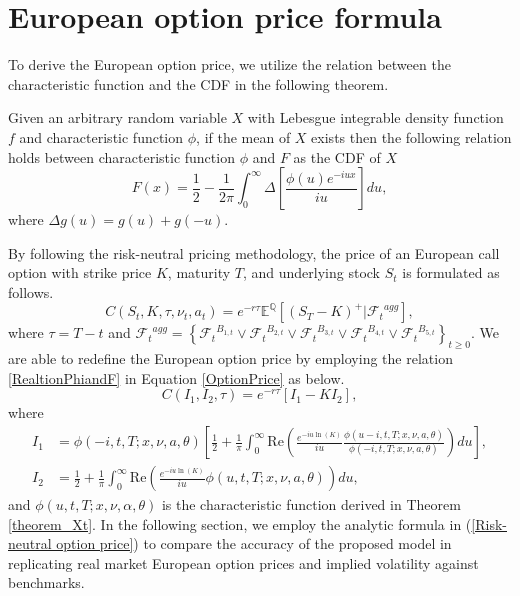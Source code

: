\documentclass[twoside]{article}
\begin{document}
\section{European option price formula}
To derive the European option price, we utilize the relation between the characteristic function and the CDF in the following theorem.
%
\begin{thm}\label{theorem_relation}
Given an arbitrary random variable $ X $ with Lebesgue integrable density function $ f $ and characteristic function $ \phi $, if the mean of $ X $ exists
then the following relation holds between characteristic function $ \phi $ and $ F $ as the CDF of $ X $
\begin{equation}\label{RealtionPhiandF}
F\left( x\right) =\frac{1}{2} - \frac{1}{2\pi}\int^{\infty}_{0} \Delta \left[ \frac{\phi\left( u \right) e^{-iux}}{iu} \right] du,
\end{equation}
where $ \Delta g(u)=g(u)+g(-u) $.
\end{thm}
\noindent
By following the risk-neutral pricing methodology, the price of an European call option with strike price $K$, maturity $T$, and underlying stock $S_t$ is 
formulated as follows.
\begin{equation}\label{OptionPrice}
C(S_t, K, \tau, \nu_t, a_t)=e^{-r\tau} \mathbb{E}^{\mathbb{Q}}\left[ (S_T - K )^{+} \vert {\mathcal{F}_t}^{agg} \right], 
\end{equation}
where $ \tau=T-t $ and $ {\mathcal{F}_t}^{agg} =\left\lbrace  {\mathcal{F}_t}^{B_{1,t}}  \vee  {\mathcal{F}_t}^{B_{2,t}}  \vee
{\mathcal{F}_t}^{B_{3,t}} \vee {\mathcal{F}_t}^{B_{4,t}}  \vee {\mathcal{F}_t}^{B_{5,t}}    \right\rbrace_{t \geq 0}$. 
We are able to redefine the European option price by employing the relation \eqref{RealtionPhiandF} in Equation \eqref{OptionPrice} as below.
%
\begin{equation}\label{Risk-neutral option price} 
C(I_1,I_2,\tau) = e^{-r\tau} \left[ I_1 - K I_2 \right],
\end{equation}
where 
\begin{align*}
I_1 &= \phi(-i,t,T;x,\nu, a, \theta) \left[ \frac{1}{2} + \frac{1}{\pi} \int_0^{\infty} \mathrm{Re} \left( \frac{ e^{-iu \ln(K)} }{iu} 
\frac{\phi(u - i,t,T;x,\nu,a, \theta)}{\phi(-i,t,T;x,\nu,a, \theta)} \right) du \right], %
\\
I_2 &= \frac{1}{2} + \frac{1}{\pi} \int_0^{\infty} \mathrm{Re} \left( \frac{ e^{-iu \ln(K)} }{iu} \phi(u,t,T;x,\nu,a, \theta) \right) du, 
\end{align*}
and $ \phi(u,t,T;x,\nu,\alpha,\theta) $ is the characteristic function derived in Theorem \ref{theorem_Xt}. In the following section, we employ the analytic 
formula in (\ref{Risk-neutral option price}) to compare the accuracy of the proposed model in replicating real market European option prices and implied 
volatility against benchmarks.
\end{document}
